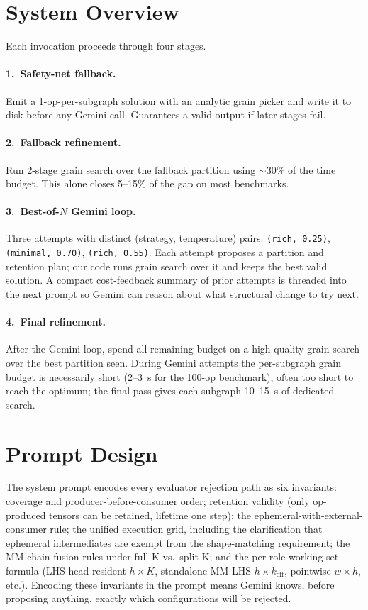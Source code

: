 \section{System Overview}

Each invocation proceeds through four stages.

\paragraph{1.~Safety-net fallback.}
Emit a 1-op-per-subgraph solution with an analytic grain picker and
write it to disk before any Gemini call. Guarantees a valid output if
later stages fail.

\paragraph{2.~Fallback refinement.}
Run 2-stage grain search over the fallback partition using $\sim$30\%
of the time budget. This alone closes 5--15\% of the gap on most
benchmarks.

\paragraph{3.~Best-of-$N$ Gemini loop.}
Three attempts with distinct (strategy, temperature) pairs:
\texttt{(rich, 0.25)}, \texttt{(minimal, 0.70)}, \texttt{(rich, 0.55)}.
Each attempt proposes a partition and retention plan; our code runs
grain search over it and keeps the best valid solution. A compact
cost-feedback summary of prior attempts is threaded into the next
prompt so Gemini can reason about what structural change to try next.

\paragraph{4.~Final refinement.}
After the Gemini loop, spend all remaining budget on a high-quality
grain search over the best partition seen. During Gemini attempts the
per-subgraph grain budget is necessarily short (2--3~s for the 100-op
benchmark), often too short to reach the optimum; the final pass gives
each subgraph 10--15~s of dedicated search.


\section{Prompt Design}

The system prompt encodes every evaluator rejection path as six
invariants: coverage and producer-before-consumer order; retention
validity (only op-produced tensors can be retained, lifetime one
step); the ephemeral-with-external-consumer rule; the unified
execution grid, including the clarification that ephemeral
intermediates are exempt from the shape-matching requirement; the
MM-chain fusion rules under full-K vs.\ split-K; and the per-role
working-set formula (LHS-head resident $h\times K$, standalone MM
LHS $h\times k_\mathrm{eff}$, pointwise $w\times h$, etc.). Encoding
these invariants in the prompt means Gemini knows, before proposing
anything, exactly which configurations will be rejected.


